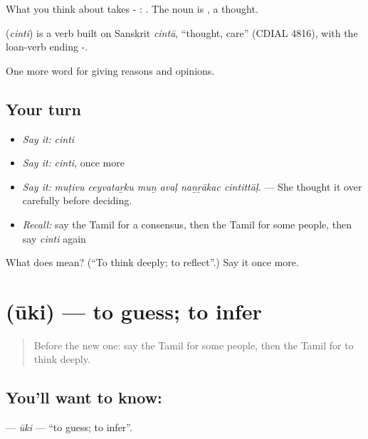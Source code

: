 What you think about takes - :   . The noun is , a thought.

\begin{cousinweb}
\textbf{} (\emph{cinti}) is a verb built on Sanskrit \emph{cintā}, \textquotedblleft{}thought, care\textquotedblright{} (CDIAL 4816), with the loan-verb ending -.
\end{cousinweb}

\begin{grammarlens}[title={What you've built}]
One more word for giving reasons and opinions.
\end{grammarlens}

\subsection*{Your turn}
\begin{itemize}
\raggedright
  \item \emph{Say it:} \emph{cinti}
  \item \emph{Say it:} \emph{cinti}, once more
  \item \emph{Say it:} \emph{muṭivu ceyvataṟku muṉ avaḷ naṉṟākac cintittāḷ.} — She thought it over carefully before deciding.
  \item \emph{Recall:} say the Tamil for a consensus, then the Tamil for some people, then say \emph{cinti} again
\end{itemize}

\begin{tcolorbox}[breakable,colback=teal!4,colframe=teal!35!black,title={Before you move on}]
What does  mean? (\textquotedblleft{}To think deeply; to reflect\textquotedblright{}.) Say it once more.
\end{tcolorbox}
\section[\texorpdfstring{\ta{ஊகி} (ūki)}{ஊகி (ūki)}]{ (ūki) — to guess; to infer}

\label{lesson:TA-C349-uki}



\begin{quote}
Before the new one: say the Tamil for some people, then the Tamil for to think deeply.
\end{quote}

\subsection*{You'll want to know: }
\textbf{} — \emph{ūki} — \textquotedblleft{}to guess; to infer\textquotedblright{}.

